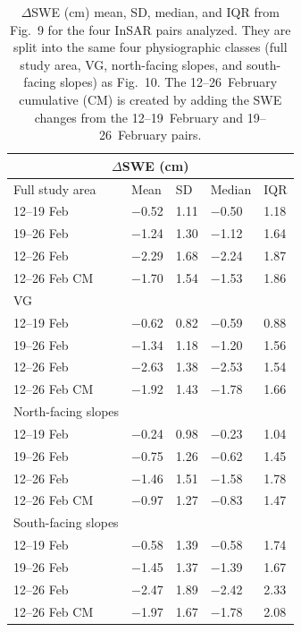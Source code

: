 \begin{table}[t]
\centering
\caption{$\Delta$SWE (cm) mean, SD, median, and IQR from Fig.~9 for the four InSAR pairs analyzed. They are split into the same four physiographic classes (full study area, VG, north-facing slopes, and south-facing slopes) as Fig.~10. The 12--26~February cumulative (CM) is created by adding the SWE changes from the 12--19~February and 19--26~February pairs.}
\begin{tabular}{lllll}
\toprule
\multicolumn{5}{c}{$\Delta$SWE (cm)} \\
\midrule
Full study area & Mean & SD & Median & IQR \\
\midrule
12--19 Feb & $-$0.52 & 1.11 & $-$0.50 & 1.18\\
19--26 Feb & $-$1.24 & 1.30 & $-$1.12 & 1.64\\
12--26 Feb & $-$2.29 & 1.68 & $-$2.24 & 1.87\\
12--26 Feb CM & $-$1.70 & 1.54 & $-$1.53 & 1.86\\
\midrule
VG \\
\midrule
12--19 Feb & $-$0.62 & 0.82 & $-$0.59 & 0.88\\
19--26 Feb & $-$1.34 & 1.18 & $-$1.20 & 1.56\\
12--26 Feb & $-$2.63 & 1.38 & $-$2.53 & 1.54\\
12--26 Feb CM & $-$1.92 & 1.43 & $-$1.78 & 1.66\\
\midrule
North-facing slopes \\
\midrule
12--19 Feb & $-$0.24 & 0.98 & $-$0.23 & 1.04\\
19--26 Feb & $-$0.75 & 1.26 & $-$0.62 & 1.45\\
12--26 Feb & $-$1.46 & 1.51 & $-$1.58 & 1.78\\
12--26 Feb CM & $-$0.97 & 1.27 & $-$0.83 & 1.47\\
\midrule
South-facing slopes \\
\midrule
12--19 Feb & $-$0.58 & 1.39 & $-$0.58 & 1.74\\
19--26 Feb & $-$1.45 & 1.37 & $-$1.39 & 1.67\\
12--26 Feb & $-$2.47 & 1.89 & $-$2.42 & 2.33\\
12--26 Feb CM & $-$1.97 & 1.67 & $-$1.78 & 2.08\\
\bottomrule
\end{tabular}
\end{table}


